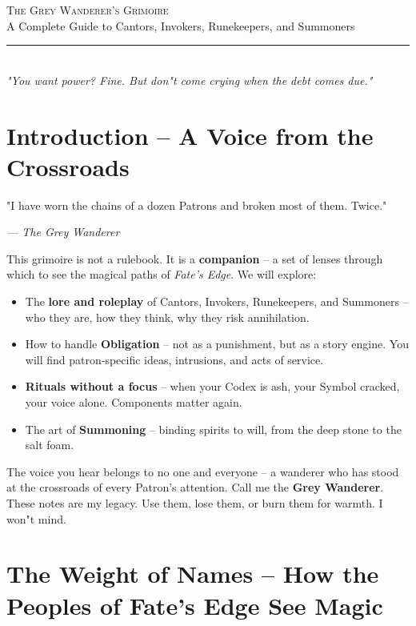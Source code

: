 \documentclass[10pt,a5paper]{book}
\begin{document}
\frontmatter
\thispagestyle{empty}
\vspace*{2cm}
\begin{center}
{\Huge\scshape The Grey Wanderer's Grimoire}\\[0.5cm]
{\Large A Complete Guide to Cantors, Invokers, Runekeepers, and Summoners}\\[1cm]
\rule{0.6\textwidth}{0.5pt}\\[1cm]
{\itshape "You want power? Fine. But don"t come crying when the debt comes due."}
\end{center}
\vfill
\clearpage

\tableofcontents
\clearpage

\mainmatter

\chapter{Introduction -- A Voice from the Crossroads}
\epigraph{"I have worn the chains of a dozen Patrons and broken most of them. Twice."}{\textit{--- The Grey Wanderer}}

This grimoire is not a rulebook. It is a \textbf{companion} -- a set of lenses through which to see the magical paths of \textit{Fate's Edge}. We will explore:

\begin{itemize}
    \item The \textbf{lore and roleplay} of Cantors, Invokers, Runekeepers, and Summoners -- who they are, how they think, why they risk annihilation.
    \item How to handle \textbf{Obligation} -- not as a punishment, but as a story engine. You will find patron‑specific ideas, intrusions, and acts of service.
    \item \textbf{Rituals without a focus} -- when your Codex is ash, your Symbol cracked, your voice alone. Components matter again.
    \item The art of \textbf{Summoning} -- binding spirits to will, from the deep stone to the salt foam.
\end{itemize}

The voice you hear belongs to no one and everyone -- a wanderer who has stood at the crossroads of every Patron's attention. Call me the \textbf{Grey Wanderer}. These notes are my legacy. Use them, lose them, or burn them for warmth. I won"t mind.

\clearpage

\chapter{The Weight of Names -- How the Peoples of Fate's Edge See Magic}
\end{document}
